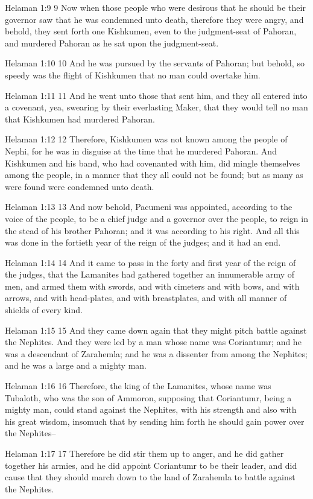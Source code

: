 Helaman 1:9
 9 Now when those people who were desirous that he should be
their governor saw that he was condemned unto death, therefore
they were angry, and behold, they sent forth one Kishkumen, even
to the judgment-seat of Pahoran, and murdered Pahoran as he sat
upon the judgment-seat.

Helaman 1:10
 10 And he was pursued by the servants of Pahoran; but behold, so
speedy was the flight of Kishkumen that no man could overtake
him.

Helaman 1:11
 11 And he went unto those that sent him, and they all entered
into a covenant, yea, swearing by their everlasting Maker, that
they would tell no man that Kishkumen had murdered Pahoran.

Helaman 1:12
 12 Therefore, Kishkumen was not known among the people of Nephi,
for he was in disguise at the time that he murdered Pahoran. And
Kishkumen and his band, who had covenanted with him, did mingle
themselves among the people, in a manner that they all could not
be found; but as many as were found were condemned unto death.

Helaman 1:13
 13 And now behold, Pacumeni was appointed, according to the
voice of the people, to be a chief judge and a governor over the
people, to reign in the stead of his brother Pahoran; and it was
according to his right. And all this was done in the fortieth
year of the reign of the judges; and it had an end.

Helaman 1:14
 14 And it came to pass in the forty and first year of the reign
of the judges, that the Lamanites had gathered together an
innumerable army of men, and armed them with swords, and with
cimeters and with bows, and with arrows, and with head-plates,
and with breastplates, and with all manner of shields of every
kind.

Helaman 1:15
 15 And they came down again that they might pitch battle against
the Nephites. And they were led by a man whose name was
Coriantumr; and he was a descendant of Zarahemla; and he was a
dissenter from among the Nephites; and he was a large and a
mighty man.

Helaman 1:16
 16 Therefore, the king of the Lamanites, whose name was
Tubaloth, who was the son of Ammoron, supposing that Coriantumr,
being a mighty man, could stand against the Nephites, with his
strength and also with his great wisdom, insomuch that by sending
him forth he should gain power over the Nephites--

Helaman 1:17
 17 Therefore he did stir them up to anger, and he did gather
together his armies, and he did appoint Coriantumr to be their
leader, and did cause that they should march down to the land of
Zarahemla to battle against the Nephites.

